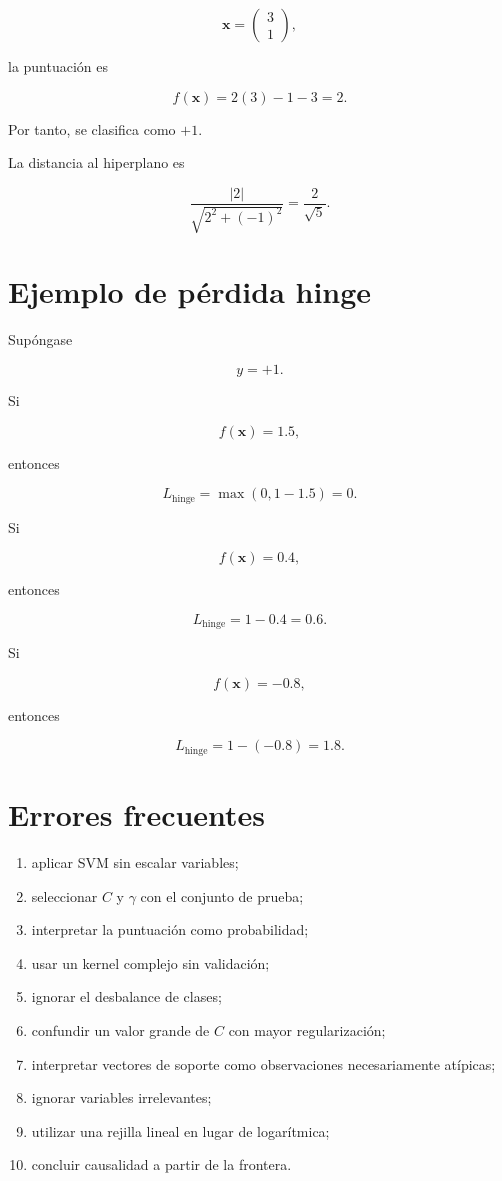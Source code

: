\documentclass[
  spanish,
  10.5pt,
  letterpaper,
  DIV=11,
  numbers=noendperiod,
  oneside,
  open=any]{scrreprt}
\providecommand{\tightlist}{%
  \setlength{\itemsep}{0pt}\setlength{\parskip}{0pt}}
\theoremstyle{definition}
\theoremstyle{definition}
\theoremstyle{plain}
\theoremstyle{remark}
\begin{document}
\[
\mathbf{x}
=
\begin{pmatrix}
3\\
1
\end{pmatrix},
\]

la puntuación es

\[
f(\mathbf{x})
=
2(3)-1-3
=
2.
\]

Por tanto, se clasifica como \(+1\).

La distancia al hiperplano es

\[
\frac{|2|}{
\sqrt{2^2+(-1)^2}
}
=
\frac{2}{\sqrt{5}}.
\]

\section*{Ejemplo de pérdida hinge}\label{ejemplo-de-puxe9rdida-hinge}


Supóngase

\[
y=+1.
\]

Si

\[
f(\mathbf{x})=1.5,
\]

entonces

\[
L_{\text{hinge}}
=
\max(0,1-1.5)
=
0.
\]

Si

\[
f(\mathbf{x})=0.4,
\]

entonces

\[
L_{\text{hinge}}
=
1-0.4
=
0.6.
\]

Si

\[
f(\mathbf{x})=-0.8,
\]

entonces

\[
L_{\text{hinge}}
=
1-(-0.8)
=
1.8.
\]

\section*{Errores frecuentes}\label{errores-frecuentes-13}


\begin{enumerate}
\def\labelenumi{\arabic{enumi}.}
\tightlist
\item
  aplicar SVM sin escalar variables;
\item
  seleccionar \(C\) y \(\gamma\) con el conjunto de prueba;
\item
  interpretar la puntuación como probabilidad;
\item
  usar un kernel complejo sin validación;
\item
  ignorar el desbalance de clases;
\item
  confundir un valor grande de \(C\) con mayor regularización;
\item
  interpretar vectores de soporte como observaciones necesariamente
  atípicas;
\item
  ignorar variables irrelevantes;
\item
  utilizar una rejilla lineal en lugar de logarítmica;
\item
  concluir causalidad a partir de la frontera.
\end{enumerate}
\end{document}
